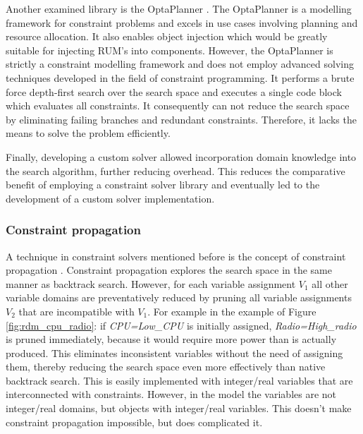 Another examined library is the OptaPlanner \cite{web:opta}. The OptaPlanner is a modelling framework for constraint problems and excels in use cases involving planning and resource allocation. It also enables object injection which would be greatly suitable for injecting RUM's into components. However, the OptaPlanner is strictly a constraint modelling framework and does not employ advanced solving techniques developed in the field of constraint programming. It performs a brute force depth-first search over the search space and executes a single code block which evaluates all constraints. It consequently can not reduce the search space by eliminating failing branches and redundant constraints. Therefore, it lacks the means to solve the problem efficiently.

Finally, developing a custom solver allowed incorporation domain knowledge into the search algorithm, further reducing overhead. This reduces the comparative benefit of employing a constraint solver library and eventually led to the development of a custom solver implementation.

\subsubsection{Constraint propagation}
A technique in constraint solvers mentioned before is the concept of constraint propagation \cite{constraint_general}. Constraint propagation explores the search space in the same manner as backtrack search. However, for each variable assignment $V_1$ all other variable domains are preventatively reduced by pruning all variable assignments $V_2$ that are incompatible with $V_1$. For example in the example of Figure \ref{fig:rdm_cpu_radio}: if \emph{CPU=Low\_CPU} is initially assigned, \emph{Radio=High\_radio} is pruned immediately, because it would require more power than is actually produced. This eliminates inconsistent variables without the need of assigning them, thereby reducing the search space even more effectively than native backtrack search. This is easily implemented with integer/real variables that are interconnected with constraints. However, in the model the variables are not integer/real domains, but objects with integer/real variables. This doesn't make constraint propagation impossible, but does complicated it.

